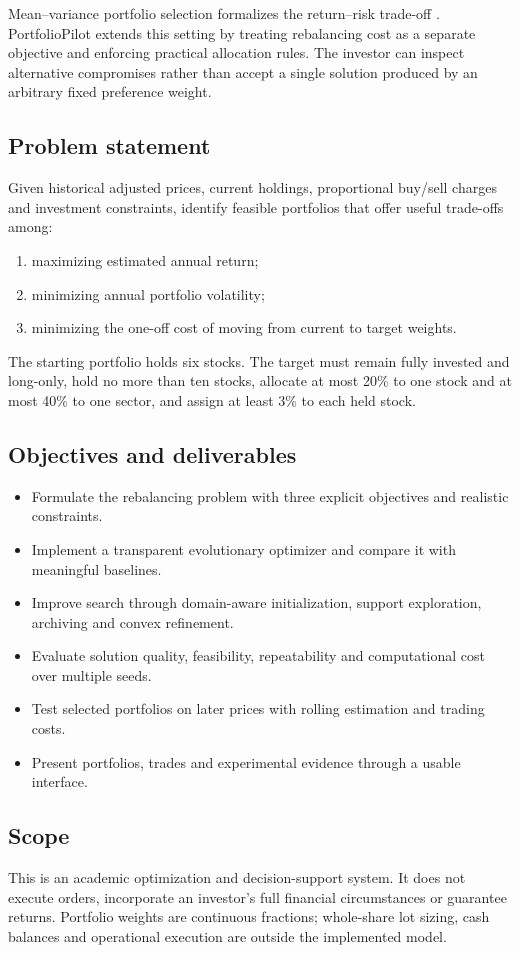 \documentclass[12pt,a4paper]{article}
\begin{document}
Mean--variance portfolio selection formalizes the return--risk trade-off \cite{markowitz}. PortfolioPilot extends this setting by treating rebalancing cost as a separate objective and enforcing practical allocation rules. The investor can inspect alternative compromises rather than accept a single solution produced by an arbitrary fixed preference weight.
\subsection{Problem statement}
Given historical adjusted prices, current holdings, proportional buy/sell charges and investment constraints, identify feasible portfolios that offer useful trade-offs among:
\begin{enumerate}
\item maximizing estimated annual return;
\item minimizing annual portfolio volatility;
\item minimizing the one-off cost of moving from current to target weights.
\end{enumerate}
The starting portfolio holds six stocks. The target must remain fully invested and long-only, hold no more than ten stocks, allocate at most 20\% to one stock and at most 40\% to one sector, and assign at least 3\% to each held stock.
\subsection{Objectives and deliverables}
\begin{itemize}
\item Formulate the rebalancing problem with three explicit objectives and realistic constraints.
\item Implement a transparent evolutionary optimizer and compare it with meaningful baselines.
\item Improve search through domain-aware initialization, support exploration, archiving and convex refinement.
\item Evaluate solution quality, feasibility, repeatability and computational cost over multiple seeds.
\item Test selected portfolios on later prices with rolling estimation and trading costs.
\item Present portfolios, trades and experimental evidence through a usable interface.
\end{itemize}
\subsection{Scope}
This is an academic optimization and decision-support system. It does not execute orders, incorporate an investor's full financial circumstances or guarantee returns. Portfolio weights are continuous fractions; whole-share lot sizing, cash balances and operational execution are outside the implemented model.
\end{document}
